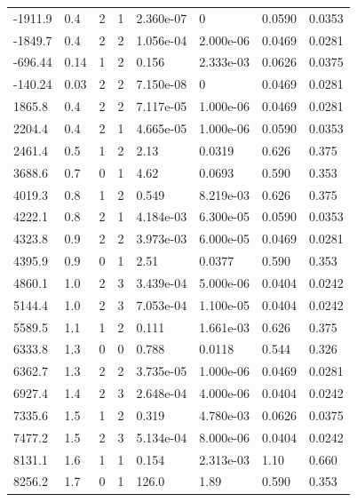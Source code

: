 \documentclass[preview]{standalone}
\begin{document}
{{\begin{tabular}{L{1.2cm}C{1.2cm} C{0.3cm}C{0.5cm} C{1.4cm}C{1.4cm} C{1.4cm}C{1.4cm}}
  -1911.9  &   0.4  & 2     &  1 &  2.360e-07  & 0  & 0.0590 &  0.0353   \\ 
  -1849.7  &   0.4  & 2     &  2 &  1.056e-04  & 2.000e-06  & 0.0469 &  0.0281   \\ 
  -696.44  &  0.14  & 1     &  2 &  0.156  & 2.333e-03  & 0.0626 &  0.0375   \\ 
  -140.24  &  0.03  & 2     &  2 &  7.150e-08  & 0  & 0.0469 &  0.0281   \\ 
  1865.8  &   0.4  & 2     &  2 &  7.117e-05  & 1.000e-06  & 0.0469 &  0.0281   \\ 
  2204.4  &   0.4  & 2     &  1 &  4.665e-05  & 1.000e-06  & 0.0590 &  0.0353   \\ 
  2461.4  &   0.5  & 1     &  2 &  2.13  & 0.0319  & 0.626 &  0.375   \\ 
  3688.6  &   0.7  & 0     &  1 &  4.62  & 0.0693  & 0.590 &  0.353   \\ 
  4019.3  &   0.8  & 1     &  2 &  0.549  & 8.219e-03  & 0.626 &  0.375   \\ 
  4222.1  &   0.8  & 2     &  1 &  4.184e-03  & 6.300e-05  & 0.0590 &  0.0353   \\ 
  4323.8  &   0.9  & 2     &  2 &  3.973e-03  & 6.000e-05  & 0.0469 &  0.0281   \\ 
  4395.9  &   0.9  & 0     &  1 &  2.51  & 0.0377  & 0.590 &  0.353   \\ 
  4860.1  &   1.0  & 2     &  3 &  3.439e-04  & 5.000e-06  & 0.0404 &  0.0242   \\ 
  5144.4  &   1.0  & 2     &  3 &  7.053e-04  & 1.100e-05  & 0.0404 &  0.0242   \\ 
  5589.5  &   1.1  & 1     &  2 &  0.111  & 1.661e-03  & 0.626 &  0.375   \\ 
  6333.8  &   1.3  & 0     &  0 &  0.788  & 0.0118  & 0.544 &  0.326   \\ 
  6362.7  &   1.3  & 2     &  2 &  3.735e-05  & 1.000e-06  & 0.0469 &  0.0281   \\ 
  6927.4  &   1.4  & 2     &  3 &  2.648e-04  & 4.000e-06  & 0.0404 &  0.0242   \\ 
  7335.6  &   1.5  & 1     &  2 &  0.319  & 4.780e-03  & 0.0626 &  0.0375   \\ 
  7477.2  &   1.5  & 2     &  3 &  5.134e-04  & 8.000e-06  & 0.0404 &  0.0242   \\ 
  8131.1  &   1.6  & 1     &  1 &  0.154  & 2.313e-03  & 1.10 &  0.660   \\ 
  8256.2  &   1.7  & 0     &  1 &  126.0  & 1.89  & 0.590 &  0.353   \\ 

\end{tabular}}}
\end{document}
